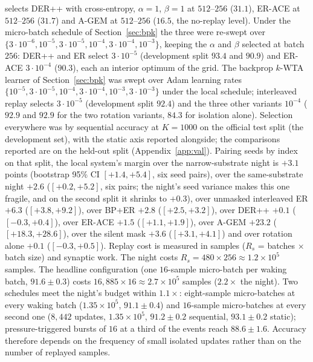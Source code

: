 \documentclass{article}
\newcommand{\kwta}{$k$-WTA}
\begin{document}
selects DER++ with cross-entropy, $\alpha=1$, $\beta=1$ at $512$--$256$ ($31.1$), ER-ACE at
$512$--$256$ ($31.7$) and A-GEM at $512$--$256$ ($16.5$, the no-replay level). Under the
micro-batch schedule of Section~\ref{sec:bpk} the three were re-swept over
$\{3{\cdot}10^{-6},10^{-5},3{\cdot}10^{-5},10^{-4},3{\cdot}10^{-4},10^{-3}\}$, keeping the
$\alpha$ and $\beta$ selected at batch $256$: DER++ and ER select $3{\cdot}10^{-5}$
(development split $93.4$ and $90.9$) and ER-ACE $3{\cdot}10^{-4}$ ($90.3$), each an
interior optimum of the grid. The backprop
\kwta{} learner of Section~\ref{sec:bpk} was swept over Adam learning rates
$\{10^{-5},3{\cdot}10^{-5},10^{-4},3{\cdot}10^{-4},10^{-3},3{\cdot}10^{-3}\}$ under the local
schedule; interleaved replay selects $3{\cdot}10^{-5}$ (development split $92.4$) and the
three other variants $10^{-4}$ ($92.9$ and $92.9$ for the two rotation variants, $84.3$ for
isolation alone). Selection
everywhere was by sequential accuracy at $K{=}1000$ on the official test split (the
development set), with the static axis reported alongside; the comparisons reported are on
the held-out split (Appendix~\ref{app:val}).
Pairing seeds by index on that split, the local system's margin over the narrow-substrate
night is $+3.1$ points (bootstrap 95\% CI $[+1.4,+5.4]$, six seed pairs), over the
same-substrate night $+2.6$ ($[+0.2,+5.2]$, six pairs; the night's seed variance makes this
one fragile, and on the second split it shrinks to $+0.3$), over unmasked interleaved ER
$+6.3$ ($[+3.8,+9.2]$), over BP+ER $+2.8$ ($[+2.5,+3.2]$), over DER++ $+0.1$
($[-0.3,+0.4]$), over ER-ACE $+1.5$ ($[+1.1,+1.9]$), over A-GEM $+23.2$ ($[+18.3,+28.6]$),
over the silent mask $+3.6$ ($[+3.1,+4.1]$) and over rotation alone $+0.1$
($[-0.3,+0.5]$).
Replay cost is measured in samples ($R_s$ = batches $\times$ batch size) and synaptic work.
The night costs $R_s = 480\times256 \approx 1.2\times10^5$ samples. The headline
configuration (one $16$-sample micro-batch per waking batch, $91.6\pm0.3$) costs
$16{,}885\times16\approx2.7\times10^5$ samples ($2.2\times$ the night). Two schedules meet
the night's budget within $1.1\times$: eight-sample micro-batches at every waking batch
($1.35\times10^5$, $91.1\pm0.4$) and $16$-sample micro-batches at every second one ($8{,}442$
updates, $1.35\times10^5$, $91.2\pm0.2$ sequential, $93.1\pm0.2$ static);
pressure-triggered bursts of $16$ at a third of the events reach $88.6\pm1.6$. Accuracy
therefore depends on the frequency of small isolated updates rather than on the number of
replayed samples.
\end{document}
